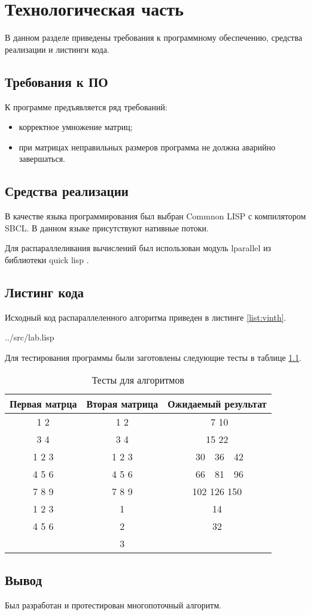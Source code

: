 \chapter{Технологическая часть}

В данном разделе приведены требования к программному обеспечению, средства реализации и листинги кода.

\section{Требования к ПО}

К программе предъявляется ряд требований:
\begin{itemize}
	\item корректное умножение матриц;
	\item при матрицах неправильных размеров программа не должна аварийно завершаться.
\end{itemize}


\section{Средства реализации}

В качестве языка программирования был выбран {\ttfamily Commnon LISP} с компилятором {\ttfamily SBCL}. В данном языке присутствуют нативные потоки.

Для распараллеливания вычислений был использован модуль {\ttfamily lparallel} из библиотеки {\ttfamily quick lisp} \cite{thread}.


\clearpage
\section{Листинг кода}

Исходный код распараллеленного алгоритма приведен в листинге \ref{list:vinth}.

\begin{lstinputlisting}[
	caption={Параллельный классический алгоритм},
	label={list:vinth},
	language={Lisp},
	style={go},
	linerange={1-57},
	]{../src/lab.lisp}
\end{lstinputlisting}

Для тестирования программы были заготовлены следующие тесты в таблице
\ref{table:test}.

\begin{table}[h]
	\caption{Тесты для алгоритмов}
	\label{table:test}
	\centering
	\begin{tabular}{|c|c|c|}
		\hline
		Первая матрца & Вторая матрица & Ожидаемый результат \\
		\hline
		1 2 & 1 2 & \ 7 10 \\
		3 4 & 3 4 & 15 22 \\
		\hline
		1 2 3 & 1 2 3 & \ 30\ \ 36\ \ 42 \\
		4 5 6 & 4 5 6 & \ 66\ \ 81\ \ 96 \\
		7 8 9 & 7 8 9 & 102 126 150 \\
		\hline
		1 2 3 & 1 & 14 \\
		4 5 6 & 2 & 32 \\
		& 3 & \\
		\hline
	\end{tabular}
\end{table}

\section*{Вывод}

Был разработан и протестирован многопоточный алгоритм.


